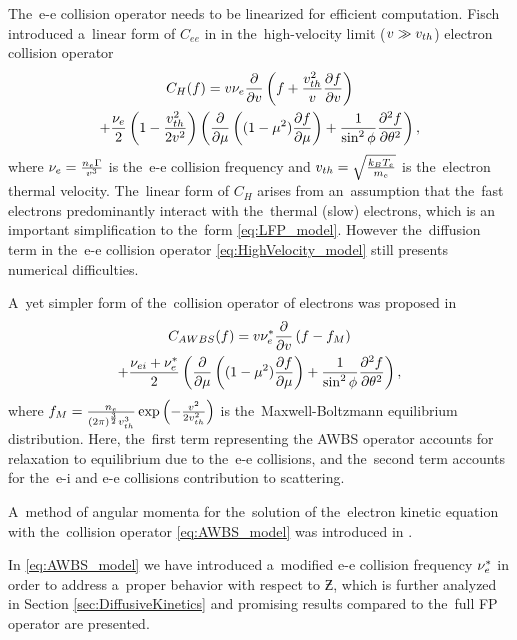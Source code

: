 The~e-e collision operator needs to be linearized for efficient computation.
Fisch introduced a~linear form of $C_{ee}$ in \cite{Fisch_RMP1987} 
in the~high-velocity limit ($v\gg v_{th}$) electron collision operator
\begin{multline}
  C_{H}(f) = v \nu_{e} \frac{\partial{}}{\partial{v}}\left(f + 
  \frac{v_{th}^2}{v}\frac{\partial{f}}{\partial{v}}\right) \\
  + \frac{\nu_{e}}{2}\left( 1 - \frac{v_{th}^2}{2v^2}\right) 
  \left(\frac{\partial{}}{\partial{\mu}}\left((1 - \mu^2)\frac{\partial{f}}{\partial{\mu}}\right)
  + \frac{1}{\sin^2\phi}\frac{\partial^2f}{\partial\theta^2} \right)
  , \label{eq:HighVelocity_model}
\end{multline}
where $\nu_{e} = \frac{n_e \Gamma}{v^3}$ is the~e-e collision 
frequency and $v_{th} = \sqrt{\frac{k_B T_e}{m_e}}$ is the~electron thermal 
velocity.
The~linear form of $C_{H}$ arises from an~assumption that the~fast electrons 
predominantly interact with the~thermal (slow) electrons, 
which is an important simplification to the~form \eqref{eq:LFP_model}.
However the~diffusion term in the~e-e collision operator 
\eqref{eq:HighVelocity_model} still presents numerical difficulties.

A~yet simpler form of the~collision operator of electrons was proposed in 
\cite{Sorbo_2015}
\begin{multline}
  C_{AWBS}(f) = v \nu_{e}^*\frac{\partial{}}{\partial{v}}\left(f - f_M\right) \\
  + \frac{\nu_{ei} + \nu_{e}^*}{2} 
  \left(\frac{\partial{}}{\partial{\mu}}\left((1 - \mu^2)\frac{\partial{f}}{\partial{\mu}}\right)
  + \frac{1}{\sin^2\phi}\frac{\partial^2f}{\partial\theta^2} \right)
  , \label{eq:AWBS_model}
\end{multline}
where $f_M = \frac{n_e}{(2\pi)^{\frac{3}{2}}v_{th}^3}
\exp\left(-\frac{v^2}{2v_{th}^2}\right)$ 
is the~Maxwell-Boltzmann equilibrium distribution.
Here, the~first term representing the AWBS operator \cite{AWBS_PRL1986}
accounts for relaxation to equilibrium due to the~e-e collisions, and 
the~second term accounts for the~e-i and e-e collisions contribution 
to scattering.

A~method of angular momenta for the~solution of the~electron kinetic equation
with the~collision operator \eqref{eq:AWBS_model} 
was introduced in \cite{Sorbo_2015, Sorbo_2016}. 

In \eqref{eq:AWBS_model} we have introduced a~modified e-e collision frequency
$\nu_{e}^*$ in order to address a~proper behavior with respect to $\Zbar$, which
is further analyzed in Section \ref{sec:DiffusiveKinetics} and promising 
results compared to the~full FP operator are presented.

